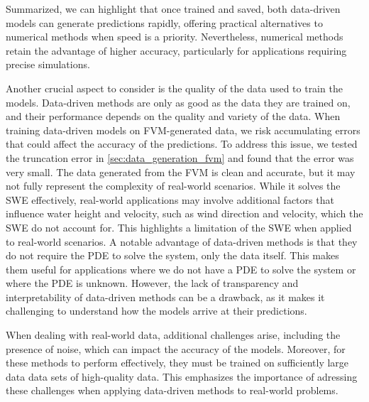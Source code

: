 Summarized, we can highlight that once trained and saved, both data-driven models can generate predictions rapidly, offering practical alternatives to numerical methods when speed is a priority.
Nevertheless, numerical methods retain the advantage of higher accuracy, particularly for applications requiring precise simulations.

Another crucial aspect to consider is the quality of the data used to train the models.
Data-driven methods are only as good as the data they are trained on, and their performance depends on the quality and variety of the data.
When training data-driven models on FVM-generated data, we risk accumulating errors that could affect the accuracy of the predictions.
To address this issue, we tested the truncation error in \autoref{sec:data_generation_fvm} and found that the error was very small.
The data generated from the FVM is clean and accurate, but it may not fully represent the complexity of real-world scenarios.
While it solves the SWE effectively, real-world applications may involve additional factors that influence water height and velocity, such as wind direction and velocity, which the SWE do not account for.
This highlights a limitation of the SWE when applied to real-world scenarios.
A notable advantage of data-driven methods is that they do not require the PDE to solve the system, only the data itself.
This makes them useful for applications where we do not have a PDE to solve the system or where the PDE is unknown.
However, the lack of transparency and interpretability of data-driven methods can be a drawback, as it makes it challenging to understand how the models arrive at their predictions.

When dealing with real-world data, additional challenges arise, including the presence of noise, which can impact the accuracy of the models.
Moreover, for these methods to perform effectively, they must be trained on sufficiently large data data sets of high-quality data.
This emphasizes the importance of adressing these challenges when applying data-driven methods to real-world problems.


